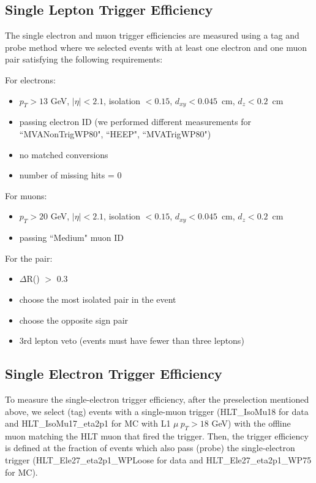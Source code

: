 \subsection{Single Lepton Trigger Efficiency}\label{sec:lepTrigger}
The single electron and muon trigger efficiencies are measured
using a tag and probe method where we selected events with at 
least one electron and one muon pair satisfying the following
requirements:

For electrons:
\begin{itemize}
  \item $p_T > 13$ GeV, $|\eta| < 2.1$, isolation $< 0.15$, $d_{xy}<0.045$~cm, $d_{z}<0.2$~cm
  \item passing electron ID (we performed different measurements for ``MVANonTrigWP80", ``HEEP", ``MVATrigWP80")
  \item no matched conversions
  \item number of missing hits = 0
\end{itemize}

For muons:
\begin{itemize}
  \item $p_T > 20$ GeV, $|\eta| < 2.1$, isolation $< 0.15$, $d_{xy}<0.045$~cm, $d_{z}<0.2$~cm
  \item passing ``Medium" muon ID
\end{itemize}

For the pair:
\begin{itemize}
  \item $\Delta$R(\emu) $>$ 0.3
  \item choose the most isolated pair in the event
  \item choose the opposite sign pair
  \item 3rd lepton veto (events must have fewer than three leptons)
\end{itemize}

\subsection{Single Electron Trigger Efficiency}\label{sec:eleTrigger}
To measure the single-electron trigger efficiency, after the
preselection mentioned above, we select (tag) events with a
single-muon trigger (HLT\_IsoMu18 for data and HLT\_IsoMu17\_eta2p1
for MC with L1 $\mu~p_{T} > 18$ GeV) with the offline muon matching
the HLT muon that fired the trigger.  Then, the trigger efficiency is
defined at the fraction of events which also pass (probe) the
single-electron trigger (HLT\_Ele27\_eta2p1\_WPLoose for data and
HLT\_Ele27\_eta2p1\_WP75 for MC).

